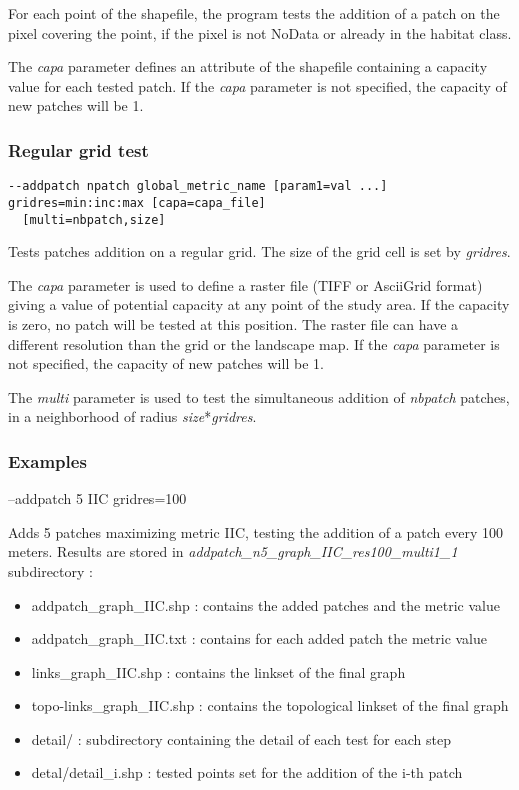 \documentclass[a4paper,10pt]{report}
\newenvironment{cmd}
{\quote\Verbatim}
{\endVerbatim\endquote}
\begin{document}
For each point of the shapefile, the program tests the addition of a patch on the pixel covering the point, if the pixel is not NoData or already in the habitat class.

The \textit{capa} parameter defines an attribute of the shapefile containing a capacity value for each tested patch.
If the \textit{capa} parameter is not specified, the capacity of new patches will be 1.


\subsubsection{Regular grid test}
\begin{verbatim}
--addpatch npatch global_metric_name [param1=val ...] gridres=min:inc:max [capa=capa_file] 
  [multi=nbpatch,size]
\end{verbatim}
Tests patches addition on a regular grid. The size of the grid cell is set by \textit{gridres}.

The \textit{capa} parameter is used to define a raster file (TIFF or AsciiGrid format) giving a value of potential capacity at any point of the study area.
If the capacity is zero, no patch will be tested at this position. The raster file can have a different resolution than the grid or the landscape map.
If the \textit{capa} parameter is not specified, the capacity of new patches will be 1.

The \textit{multi} parameter is used to test the simultaneous addition of \textit{nbpatch} patches, in a neighborhood of radius \textit{size}*\textit{gridres}.

\subsubsection{Examples}

\begin{cmd}
--addpatch 5 IIC gridres=100
\end{cmd}

Adds 5 patches maximizing metric IIC, testing the addition of a patch every 100 meters.
Results are stored in \textit{addpatch\_n5\_graph\_IIC\_res100\_multi1\_1} subdirectory :
\begin{itemize}
 \item addpatch\_graph\_IIC.shp : contains the added patches and the metric value 
 \item addpatch\_graph\_IIC.txt : contains for each added patch the metric value 
 \item links\_graph\_IIC.shp : contains the linkset of the final graph
 \item topo-links\_graph\_IIC.shp : contains the topological linkset of the final graph
 \item detail/ : subdirectory containing the detail of each test for each step
 \item detal/detail\_i.shp : tested points set for the addition of the i-th patch 
\end{itemize}
\end{document}

